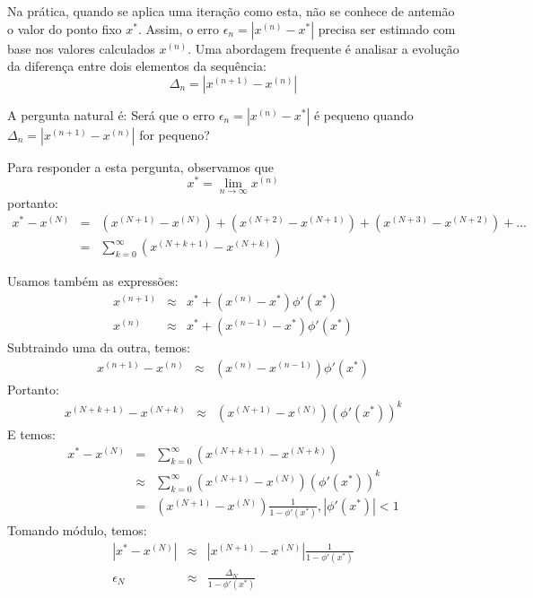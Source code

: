 \documentclass[main.tex]{subfiles}
\begin{document}
Na prática, quando se aplica uma iteração como esta, não se conhece de antemão o valor do ponto fixo $x^*$. Assim, o erro $\epsilon_n=\left|x^{(n)}-x^*\right|$ precisa ser estimado com base nos valores calculados $x^{(n)}$. Uma abordagem frequente é analisar a evolução da diferença entre dois elementos da sequência:
$$\Delta_n=\left|x^{(n+1)}-x^{(n)}\right|$$

A pergunta natural é: Será que o erro $\epsilon_n=\left|x^{(n)}-x^*\right|$ é pequeno quando  $\Delta_n=\left|x^{(n+1)}-x^{(n)}\right|$ for pequeno?

Para responder a esta pergunta, observamos que
$$x^*=\lim_{n\to \infty }x^{(n)}$$
portanto:
\begin{eqnarray*}
x^*-x^{(N)}&=&  \left(x^{(N+1)}-x^{(N)}\right)+\left(x^{(N+2)}-x^{(N+1)}\right)+\left(x^{(N+3)}-x^{(N+2)}\right)+\ldots\\
&=&\sum_{k=0}^\infty \left(x^{(N+k+1)}-x^{(N+k)}\right)
\end{eqnarray*}

Usamos também as expressões:
\begin{eqnarray*}
x^{(n+1)}&\approx& x^*+(x^{(n)}-x^*) \phi'(x^*)\\
x^{(n)}&\approx& x^*+(x^{(n-1)}-x^*) \phi'(x^*)
\end{eqnarray*}
Subtraindo uma da outra, temos:
\begin{eqnarray*}
x^{(n+1)}-x^{(n)}&\approx& (x^{(n)}-x^{(n-1)}) \phi'(x^*)
\end{eqnarray*}
Portanto:
\begin{eqnarray*}
x^{(N+k+1)}-x^{(N+k)}&\approx& (x^{(N+1)}-x^{(N)}) \left(\phi'(x^*)\right)^{k}
\end{eqnarray*}
E temos:
\begin{eqnarray*}
x^*-x^{(N)}
&=&\sum_{k=0}^\infty \left(x^{(N+k+1)}-x^{(N+k)}\right)\\
&\approx&\sum_{k=0}^\infty (x^{(N+1)}-x^{(N)}) \left(\phi'(x^*)\right)^{k}\\
&=&(x^{(N+1)}-x^{(N)}) \frac{1}{1-\phi'(x^*)}, \left|\phi'(x^*)\right|<1
\end{eqnarray*}
Tomando módulo, temos:
\begin{eqnarray*}
\left|x^*-x^{(N)} \right|
&\approx&\left|x^{(N+1)}-x^{(N)}\right| \frac{1}{1-\phi'(x^*)}\\
\epsilon_N &\approx&  \frac{\Delta_N}{1-\phi'(x^*)}
\end{eqnarray*}
\end{document}
